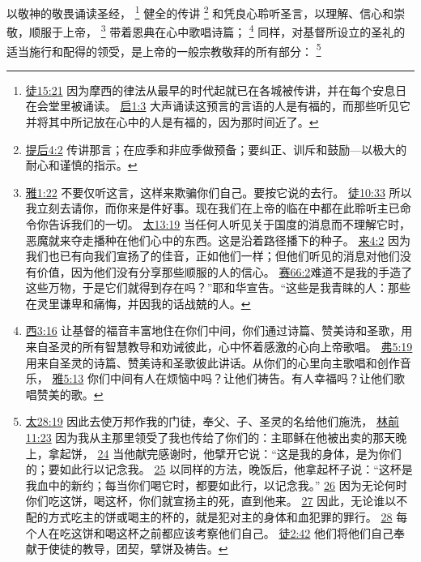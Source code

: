 \documentclass[12pt, a4paper, oneside]{ctexart}
\newcounter{parnum}[section]
\newcommand{\N}{%
   \noindent\refstepcounter{parnum}%
    \makebox[\parindent][l]{\textbf{\arabic{parnum}.}}}
\begin{document}
\N 以敬神的敬畏诵读圣经，
	\footnote {
		\href{https://biblehub.com/acts/15-21.htm}{徒15:21} 因为摩西的律法从最早的时代起就已在各城被传讲，并在每个安息日在会堂里被诵读。
		\href{https://biblehub.com/revelation/1-3.htm}{启1:3} 大声诵读这预言的言语的人是有福的，而那些听见它并将其中所记放在心中的人是有福的，因为那时间近了。
	}
	健全的传讲
	\footnote {
		\href{https://biblehub.com/2_timothy/4-2.htm}{提后4:2} 传讲那言；在应季和非应季做预备；要纠正、训斥和鼓励---以极大的耐心和谨慎的指示。
	}
	和凭良心聆听圣言，以理解、信心和崇敬，顺服于上帝，
	\footnote {
		\href{https://biblehub.com/james/1-22.htm}{雅1:22} 不要仅听这言，这样来欺骗你们自己。要按它说的去行。
		\href{https://biblehub.com/acts/10-33.htm}{徒10:33} 所以我立刻去请你，而你来是件好事。现在我们在上帝的临在中都在此聆听主已命令你告诉我们的一切。
		\href{https://biblehub.com/matthew/13-19.htm}{太13:19} 当任何人听见关于国度的消息而不理解它时，恶魔就来夺走播种在他们心中的东西。这是沿着路径播下的种子。
		\href{https://biblehub.com/hebrews/4-2.htm}{来4:2} 因为我们也已有向我们宣扬了的佳音，正如他们一样；但他们听见的消息对他们没有价值，因为他们没有分享那些顺服的人的信心。
		\href{https://biblehub.com/isaiah/66-2.htm}{赛66:2}难道不是我的手造了这些万物，于是它们就得到存在吗？”耶和华宣告。“这些是我青睐的人：那些在灵里谦卑和痛悔，并因我的话战兢的人。
	}
	带着恩典在心中歌唱诗篇；
	\footnote {
		\href{https://biblehub.com/colossians/3-16.htm}{西3:16} 让基督的福音丰富地住在你们中间，你们通过诗篇、赞美诗和圣歌，用来自圣灵的所有智慧教导和劝诫彼此，心中怀着感激的心向上帝歌唱。
		\href{https://biblehub.com/ephesians/5-19.htm}{弗5:19} 用来自圣灵的诗篇、赞美诗和圣歌彼此讲话。从你们的心里向主歌唱和创作音乐，
		\href{https://biblehub.com/james/5-13.htm}{雅5:13} 你们中间有人在烦恼中吗？让他们祷告。有人幸福吗？让他们歌唱赞美的歌。
	}
	同样，对基督所设立的圣礼的适当施行和配得的领受，是上帝的一般宗教敬拜的所有部分：
	\footnote {
		\href{https://biblehub.com/matthew/28-19.htm}{太28:19} 因此去使万邦作我的门徒，奉父、子、圣灵的名给他们施洗，
		\href{https://biblehub.com/1_corinthians/11-23.htm}{林前11:23} 因为我从主那里领受了我也传给了你们的：主耶稣在他被出卖的那天晚上，拿起饼，
		\href{https://biblehub.com/1_corinthians/11-24.htm}{24} 当他献完感谢时，他擘开它说：“这是我的身体，是为你们的；要如此行以记念我。
		\href{https://biblehub.com/1_corinthians/11-25.htm}{25} 以同样的方法，晚饭后，他拿起杯子说：“这杯是我血中的新约；每当你们喝它时，都要如此行，以记念我。”
		\href{https://biblehub.com/1_corinthians/11-26.htm}{26} 因为无论何时你们吃这饼，喝这杯，你们就宣扬主的死，直到他来。
		\href{https://biblehub.com/1_corinthians/11-27.htm}{27} 因此，无论谁以不配的方式吃主的饼或喝主的杯的，就是犯对主的身体和血犯罪的罪行。
		\href{https://biblehub.com/1_corinthians/11-28.htm}{28} 每个人在吃这饼和喝这杯之前都应该考察他们自己。
		\href{https://biblehub.com/acts/2-42.htm}{徒2:42} 他们将他们自己奉献于使徒的教导，团契，擘饼及祷告。
	}
\end{document}
